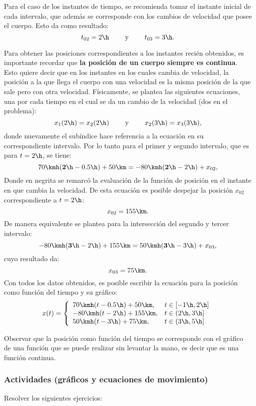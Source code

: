 Para el caso de los instantes de tiempo, se recomienda tomar el instante inicial
de cada intervalo, que además se corresponde con los cambios de velocidad que
posee el cuerpo. Esto da como resultado:
\[
t_{02} = 2\h \qquad \textrm{ y } \qquad t_{03}=3\h.
\]

Para obtener las posiciones correspondientes a los instantes recién obtenidos,
es importante recordar que \textbf{la posición de un cuerpo siempre es continua}.
Esto quiere decir que en los instantes en los cuales cambia de velocidad, la
posición a la que llega el cuerpo con una velocidad es la misma posición de la
que sale pero con otra velocidad. Físicamente, se plantea las siguientes
ecuaciones, una por cada tiempo en el cual se da un cambio de la velocidad (dos
en el problema):
\[
x_1(2\h) = x_2(2\h) \qquad \textrm{ y } \qquad
x_2(3\h) = x_3(3\h),
\]
donde nuevamente el subíndice hace referencia a la ecuación en su
correspondiente intervalo. Por lo tanto para el primer y segundo intervalo, que
es para $t=2\h$, se tiene:
\[
70\kmh(\mathbf{2\h}-0.5\h)+50\km = -80\kmh(\mathbf{2\h}-2\h)+x_{02},
\]
Donde en negrita se remarcó la evaluación de la función de posición en el
instante en que cambia la velocidad. De esta ecuación es posible despejar la
posición $x_{02}$ correspondiente a $t=2\h$:
\[
x_{02} = 155\km.
\]
De manera equivalente se plantea para la intersección del segundo y tercer
intervalo:
\[
-80\kmh(\mathbf{3\h}-2\h)+155\km = 50\kmh(\mathbf{3\h}-3\h)+x_{03},
\]
cuyo resultado da:
\[
x_{03} = 75\km.
\]
Con todos los datos obtenidos, es posible escribir la ecuación para la posición
como función del tiempo y su gráfico:
\[
x(t)= \left\{
\begin{array}{ll}
  70\kmh(t-0.5\h)+50\km, & t \in [-1\h,2\h] \\
  -80\kmh(t-2\h)+155\km, & t \in (2\h,3\h] \\
  50\kmh(t-3\h)+75\km, & t \in (3\h,5\h]\\
\end{array}
\right.
\]

Observar que la posición como función del tiempo se corresponde con el gráfico
de una función que se puede realizar sin levantar la mano, es decir que es
una función continua.
\finej


\subsubsection*{Actividades (gráficos y ecuaciones de movimiento)}
\small
Resolver los siguientes ejercicios:

